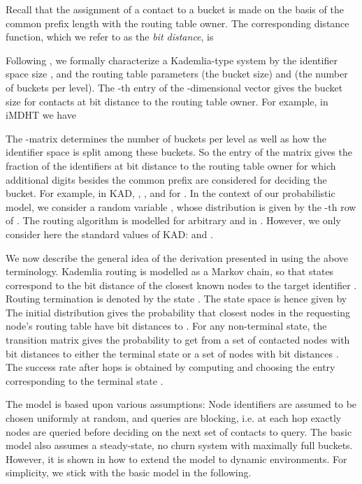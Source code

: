 \documentclass[10pt, conference, compsocconf, letterpaper]{IEEEtran}
\begin{document}
Recall that the assignment of a contact to a bucket is made on the basis of the common prefix length with the routing table owner. The corresponding distance function, which we refer to as the \emph{bit distance}, is

Following \cite{roos13comprehending}, we formally characterize a Kademlia-type system by the identifier space size ,  and the routing table parameters  (the bucket size) and  (the number of buckets per level).
The -th entry  of the -dimensional vector  gives the bucket size for contacts at bit distance  to the routing table owner. For example, in iMDHT we have


The -matrix  determines the number of buckets per level as well as how the identifier space is split among these buckets.
So the entry  of the matrix  gives the fraction of the identifiers 
at bit distance  to the routing table owner for which  additional digits besides the common prefix
are considered for deciding the bucket.
For example, in KAD,
, , and 
for . In the context of our probabilistic model, we consider a random variable , whose distribution
is given by the -th row of .
The routing algorithm is modelled for arbitrary  and  in \cite{roos13comprehending}. However, we only consider here the standard values of KAD:  and .

We now describe the general idea of the derivation presented in \cite{roos13comprehending} using the above terminology.
Kademlia routing is modelled as a Markov chain, so that states correspond to the bit distance of the closest
 known nodes to the target identifier .
Routing termination is denoted by the state . 
The state space is hence given by
 The initial distribution  gives the probability that  closest nodes in the requesting node's routing table have bit distances  to .  
For any non-terminal state, the transition matrix  gives the probability to get from a set of  contacted nodes with bit distances  to 
either the terminal state or a set of nodes with bit distances
 . 
The success rate after  hops is obtained by computing 
  and choosing the entry corresponding to the terminal state .
 
The model is based upon various assumptions: Node identifiers are assumed to be chosen uniformly at random,
and queries are blocking, i.e.  at each hop exactly  nodes are
queried before deciding on the next set of contacts to query.
The basic model also assumes a steady-state, no churn system with
maximally full buckets. 
However, it is shown in \cite{roos13comprehending} how to extend the model
to dynamic environments.
For simplicity, we stick with the basic model in the following.
\end{document}
